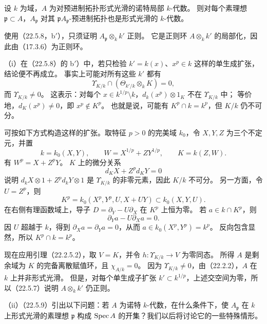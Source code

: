设 $k$ 为域，$A$ 为对预进制拓扑形式光滑的诺特局部 $k$-代数。
则对每个素理想 $\mathfrak p\subset A$，$A_{\mathfrak p}$ 对其 $\mathfrak pA_{\mathfrak p}$-预进制拓扑也是形式光滑的 $k$-代数。

\eproof
使用（22.5.8，b$'$），只须证明 $A_{\mathfrak p}\otimes_kk'$ 正则。
它是正则环 $A\otimes_kk'$ 的局部化，因此由（17.3.6）为正则环。
\finishproof

（i）在（22.5.8）的 b$'$）中，若只检验 $k'=k(x)$、$x^p\in k$ 这样的单生成扩张，结论便不再成立。
事实上可能对所有这些 $k'$ 都有
\[
 \Upsilon_{K/k}\cap(\Theta_{k'/k}\otimes_kK)=0,
\]
而 $\Upsilon_{K/k}\ne0$。
这表示：对每个 $x\in k^{1/p}\setminus k$，$d_k(x^p)\otimes1_K$ 不在 $\Upsilon_{K/k}$ 中；
等价地，$d_K(x^p)\ne0$，即 $x^p\notin K^p$。
也就是说，可能有 $K^p\cap k=k^p$，但 $K/k$ 仍不可分。

可按如下方式构造这样的扩张。取特征 $p>0$ 的完美域 $k_0$，令 $X,Y,Z$ 为三个不定元，并置
\[
 k=k_0(X,Y),\qquad W=X^{1/p}+ZY^{1/p},\qquad K=k(Z,W).
\]
有 $W^p=X+Z^pY$。
$K$ 上的微分关系
\[
 d_KX+Z^p d_KY=0
\]
说明 $d_kX\otimes1+Z^p d_kY\otimes1$ 是 $\Upsilon_{K/k}$ 的非零元素，因此 $K/k$ 不可分。
另一方面，令 $U=Z^p$，则
\[
 K^p=k_0(X^p,Y^p,U,X+UY)\subset k_0(X,Y,U).
\]
在右侧有理函数域上，导子 $D=\partial_Y-U\partial_X$ 在 $K^p$ 上恒为零。
若 $a\in k\cap K^p$，则
\[
 \partial_Ya-U\partial_Xa=0.
\]
因 $U$ 超越于 $k$，得到 $\partial_Xa=\partial_Ya=0$，从而 $a\in k_0(X^p,Y^p)=k^p$。
反向包含显然，所以 $K^p\cap k=k^p$。

现在应用引理（22.2.5.2），取 $V=K$，并令 $h:\Upsilon_{K/k}\to V$ 为零同态。
所得 $A$ 是剩余域为 $K$ 的完备离散赋值环，且 $\chi_{A/k}=0$。
因为 $\Upsilon_{K/k}\ne0$，由（22.2.2），$A$ 在 $k$ 上并非形式光滑。
但是，对每个单生成子扩张 $k'\subset k^{1/p}$，上述交空间为零，所以（22.5.7）说明 $A\otimes_kk'$ 仍正则。

（ii）（22.5.9）引出以下问题：若 $A$ 为诺特 $k$-代数，在什么条件下，使 $A_{\mathfrak p}$ 在 $k$ 上形式光滑的素理想 $\mathfrak p$ 构成 $\operatorname{Spec} A$ 的开集？我们以后将讨论它的一些特殊情形。
